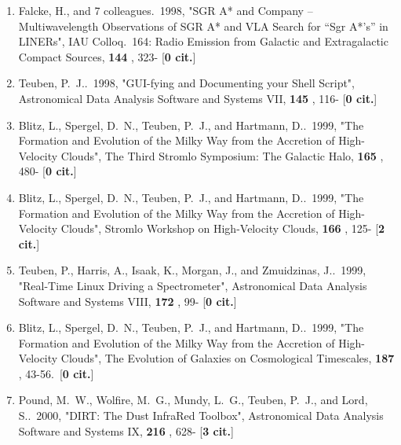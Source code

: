 \documentclass[11pt,letterpaper]{article}
\begin{document}
\begin{enumerate}[resume,label=\textbf{\arabic*}.]
\item  
Falcke, H., and 7 colleagues.\  1998,  "SGR A* and Company -- 
Multiwavelength Observations of SGR A* and VLA Search for ``Sgr A*'s'' in 
LINERs", IAU Colloq.~164: Radio Emission from Galactic and Extragalactic 
Compact Sources,  {\bf 144} , 323- [{\bf 0 cit.}] 

\item  
Teuben, P.~J..\  1998,  "GUI-fying and Documenting your Shell Script", 
Astronomical Data Analysis Software and Systems VII,  {\bf 145} , 116- 
[{\bf 0 cit.}] 





\item  
Blitz, L., Spergel, D.~N., Teuben, P.~J., and Hartmann, D..\  1999,  "The 
Formation and Evolution of the Milky Way from the Accretion of 
High-Velocity Clouds", The Third Stromlo Symposium: The Galactic Halo,  
{\bf 165} , 480- [{\bf 0 cit.}] 

\item  
Blitz, L., Spergel, D.~N., Teuben, P.~J., and Hartmann, D..\  1999,  "The 
Formation and Evolution of the Milky Way from the Accretion of 
High-Velocity Clouds", Stromlo Workshop on High-Velocity Clouds,  {\bf 166} 
, 125- [{\bf 2 cit.}] 

\item  
Teuben, P., Harris, A., Isaak, K., Morgan, J., and Zmuidzinas, J..\  1999,  
"Real-Time Linux Driving a Spectrometer", Astronomical Data Analysis 
Software and Systems VIII,  {\bf 172} , 99- [{\bf 0 cit.}] 

\item  
Blitz, L., Spergel, D.~N., Teuben, P.~J., and Hartmann, D..\  1999,  "The 
Formation and Evolution of the Milky Way from the Accretion of 
High-Velocity Clouds", The Evolution of Galaxies on Cosmological 
Timescales,  {\bf 187} , 43-56.\  [{\bf 0 cit.}] 


\item  
Pound, M.~W., Wolfire, M.~G., Mundy, L.~G., Teuben, P.~J., and Lord, S..\  
2000,  "DIRT: The Dust InfraRed Toolbox", Astronomical Data Analysis 
Software and Systems IX,  {\bf 216} , 628- [{\bf 3 cit.}] 


\end{enumerate}
\end{document}
